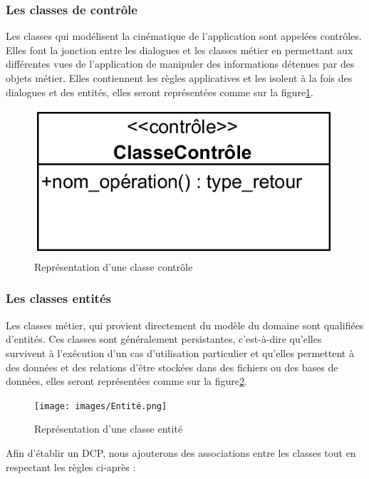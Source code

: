 \subsubsection{Les classes de contrôle}
Les classes qui modélisent la cinématique de l’application sont appelées 
contrôles. Elles font la jonction entre les dialogues et les classes métier en 
permettant aux différentes vues de l’application de manipuler des informations 
détenues par des objets métier. Elles contiennent les règles applicatives et les 
isolent à la fois des dialogues et des entités, elles seront représentées comme 
sur la figure\ref{fig21}.

\begin{figure}[h!]
    \centering
    \includegraphics[scale=1.5]{images/Controle.png}
    \caption{Représentation d'une classe contrôle}
    \label{fig21}
\end{figure}
        
\subsubsection{Les classes entités}
Les classes métier, qui provient directement du modèle du domaine sont 
qualifiées d’entités. Ces classes sont généralement persistantes, 
c’est-à-dire qu’elles survivent à l’exécution d’un cas d’utilisation 
particulier et qu’elles permettent à des données et des relations d’être 
stockées dans des fichiers ou des bases de données, elles seront 
représentées comme sur la figure\ref{fig22}.

\clearpage

\begin{figure}[h!]
    \centering
    \texttt{[image: images/Entité.png]}
    \caption{Représentation d'une classe entité}
    \label{fig22}
\end{figure}
        
Afin d’établir un DCP, nous ajouterons des associations entre les classes tout 
en respectant les règles ci-après : \cite{5}

